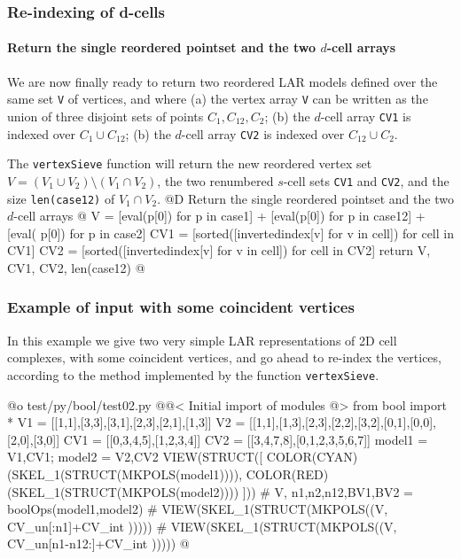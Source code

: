 \documentclass[11pt,oneside]{article}	%
\begin{document}
\subsubsection{Re-indexing of d-cells}

\paragraph{Return the single reordered pointset and the two $d$-cell arrays}
We are now finally ready to return two reordered LAR models defined over the same set \texttt{V} of vertices, and where (a) the vertex array \texttt{V} can be written as the union of three disjoint sets of points $C_1,C_{12},C_2$; (b) the $d$-cell array \texttt{CV1} is indexed over $C_1\cup C_{12}$; (b) the $d$-cell array \texttt{CV2} is indexed over $C_{12}\cup C_{2}$. 

The \texttt{vertexSieve} function will return the new reordered vertex set $V = (V_1 \cup V_2) \setminus (V_1 \cap V_2)$, the two renumbered $s$-cell sets \texttt{CV1} and \texttt{CV2}, and the size \texttt{len(case12)} of $V_1 \cap V_2$.
@D Return the single reordered pointset and the two $d$-cell arrays
@{
	V = [eval(p[0]) for p in case1] + [eval(p[0]) for p in case12] + [eval(
				p[0]) for p in case2]
	CV1 = [sorted([invertedindex[v] for v in cell]) for cell in CV1]
	CV2 = [sorted([invertedindex[v] for v in cell]) for cell in CV2]
	return V, CV1, CV2, len(case12)
@}


\subsubsection{Example of input with some coincident vertices}
In this example we give two very simple LAR representations of 2D cell complexes, with some coincident vertices, and go ahead to re-index the vertices, according to the method implemented by the function \texttt{vertexSieve}.

@o test/py/bool/test02.py
@{@< Initial import of modules @>
from bool import *
V1 = [[1,1],[3,3],[3,1],[2,3],[2,1],[1,3]]
V2 = [[1,1],[1,3],[2,3],[2,2],[3,2],[0,1],[0,0],[2,0],[3,0]]
CV1 = [[0,3,4,5],[1,2,3,4]]
CV2 = [[3,4,7,8],[0,1,2,3,5,6,7]]
model1 = V1,CV1; model2 = V2,CV2
VIEW(STRUCT([ 
	COLOR(CYAN)(SKEL_1(STRUCT(MKPOLS(model1)))), 
	COLOR(RED)(SKEL_1(STRUCT(MKPOLS(model2)))) ]))
# V, n1,n2,n12,BV1,BV2 = boolOps(model1,model2)
# VIEW(SKEL_1(STRUCT(MKPOLS((V, CV_un[:n1]+CV_int )))))
# VIEW(SKEL_1(STRUCT(MKPOLS((V, CV_un[n1-n12:]+CV_int )))))
@}
\end{document}
